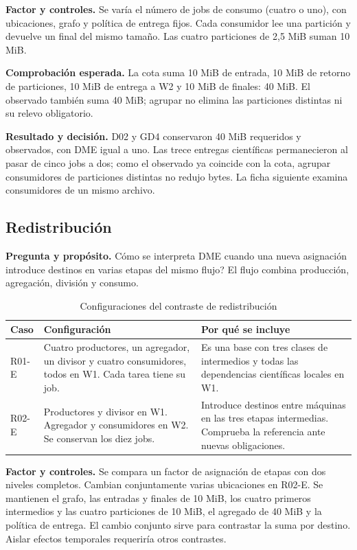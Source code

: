 \textbf{Factor y controles.} Se varía el número de jobs de consumo (cuatro o uno), con ubicaciones, grafo y política de entrega fijos. Cada consumidor lee una partición y devuelve un final del mismo tamaño. Las cuatro particiones de 2,5 MiB suman 10 MiB.

\textbf{Comprobación esperada.} La cota suma 10 MiB de entrada, 10 MiB de retorno de particiones, 10 MiB de entrega a W2 y 10 MiB de finales: 40 MiB. El observado también suma 40 MiB; agrupar no elimina las particiones distintas ni su relevo obligatorio.

\textbf{Resultado y decisión.} D02 y GD4 conservaron 40 MiB requeridos y observados, con DME igual a uno. Las trece entregas científicas permanecieron al pasar de cinco jobs a dos; como el observado ya coincide con la cota, agrupar consumidores de particiones distintas no redujo bytes. La ficha siguiente examina consumidores de un mismo archivo.


\subsection{Redistribución}
\label{sec:prueba_r}
\textbf{Pregunta y propósito.} \textquestiondown{}Cómo se interpreta DME cuando una nueva asignación introduce destinos en varias etapas del mismo flujo? El flujo combina producción, agregación, división y consumo.

\begin{table}[htbp]\centering\small
\caption{Configuraciones del contraste de redistribución}
\begin{tabularx}{\linewidth}{@{}P{1.4cm}YY@{}}
\toprule Caso & Configuración & Por qué se incluye\\\midrule
R01-E & Cuatro productores, un agregador, un divisor y cuatro consumidores, todos en W1. Cada tarea tiene su job. & Es una base con tres clases de intermedios y todas las dependencias científicas locales en W1.\\
R02-E & Productores y divisor en W1. Agregador y consumidores en W2. Se conservan los diez jobs. & Introduce destinos entre máquinas en las tres etapas intermedias. Comprueba la referencia ante nuevas obligaciones.\\
\bottomrule
\end{tabularx}
\end{table}

\textbf{Factor y controles.} Se compara un factor de asignación de etapas con dos niveles completos. Cambian conjuntamente varias ubicaciones en R02-E. Se mantienen el grafo, las entradas y finales de 10 MiB, los cuatro primeros intermedios y las cuatro particiones de 10 MiB, el agregado de 40 MiB y la política de entrega. El cambio conjunto sirve para contrastar la suma por destino. Aislar efectos temporales requeriría otros contrastes.

